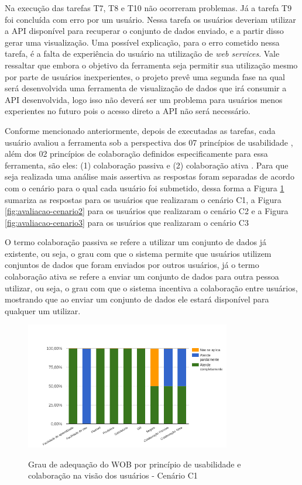 Na execução das tarefas T7, T8 e T10 não ocorreram problemas. Já a tarefa T9 foi concluída 
com erro por um usuário. Nessa tarefa os usuários deveriam utilizar a API disponível para 
recuperar o conjunto de dados enviado, e a partir disso gerar uma visualização. Uma possível 
explicação, para o erro cometido nessa tarefa, é a falta de experiência do usuário na 
utilização de \textit{web services}. Vale ressaltar que embora o objetivo da ferramenta 
seja permitir sua utilização mesmo por parte de usuários inexperientes, o projeto prevê uma 
segunda fase na qual será desenvolvida uma ferramenta de visualização de dados que irá 
consumir a API desenvolvida, logo isso não deverá ser um problema para usuários menos 
experientes no futuro pois o acesso direto a API não será necessário.

Conforme mencionado anteriormente, depois de executadas as tarefas, cada usuário avaliou a 
ferramenta sob a perspectiva dos 07 princípios de usabilidade \cite{nielsen1994usability}, 
além dos 02 princípios de colaboração definidos especificamente para essa ferramenta, são 
eles: (1) colaboração passiva e (2) colaboração ativa . Para que seja realizada uma análise 
mais assertiva as respostas foram separadas de acordo com o cenário para o qual cada usuário 
foi submetido, dessa forma a Figura \ref{fig:avaliacao-cenario1} sumariza as respostas para os 
usuários que realizaram o cenário C1, a Figura \ref{fig:avaliacao-cenario2} para os usuários 
que realizaram o cenário C2 e a Figura \ref{fig:avaliacao-cenario3} para os usuários que 
realizaram o cenário C3

O termo colaboração passiva se refere a utilizar um conjunto de dados já existente, ou 
seja, o grau com que o sistema permite que usuários utilizem conjuntos de dados que foram 
enviados por outros usuários, já o termo colaboração ativa se refere a enviar um conjunto 
de dados para outra pessoa utilizar, ou seja, o grau com que o sistema incentiva a 
colaboração entre usuários, mostrando que ao enviar um conjunto de dados ele estará 
disponível para qualquer um utilizar.

\begin{figure}[!htb]
    \centering
    \caption{Grau de adequação do WOB por princípio de usabilidade e colaboração na visão dos usuários - Cenário C1}
    \includegraphics[width=0.8\textwidth]{./04-figuras/avaliacao-cenario1}
    \label{fig:avaliacao-cenario1}
\end{figure}

